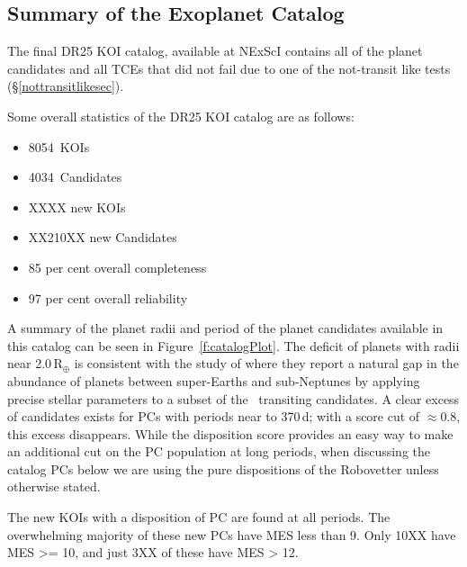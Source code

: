 \subsection{Summary of the Exoplanet Catalog}

The final DR25 KOI catalog, available at NExScI contains all of the planet candidates and all TCEs that did not fail due to one of the not-transit like tests (\S\ref{nottransitlikesec}). 


Some overall statistics of the DR25 KOI catalog are as follows:
\begin{itemize}
    \item 8054~KOIs
    \item 4034~Candidates
    \item XXXX new KOIs
    \item XX210XX new Candidates
    \item 85 per cent overall completeness
    \item 97 per cent overall reliability
\end{itemize}

A summary of the planet radii and period of the planet candidates available in this catalog can be seen in Figure~\ref{f:catalogPlot}. The deficit of planets with radii near 2.0\,R$_{\oplus}$ is consistent with the study of \citet{Fulton2017} where they report a natural gap in the abundance of planets between super-Earths and sub-Neptunes by applying precise stellar parameters to a subset of the \kepler\ transiting candidates. A clear excess of candidates exists for PCs with periods near to 370\,d;  with a score cut of $\approx0.8$, this excess disappears. While the disposition score provides an easy way to make an additional cut on the PC population at long periods, when discussing the catalog PCs below we are using the pure dispositions of the Robovetter unless otherwise stated. 

The new KOIs with a disposition of PC are found at all periods. The overwhelming majority of these new PCs have MES less than 9.  Only 10XX have MES >= 10, and just 3XX of these have MES > 12. 


